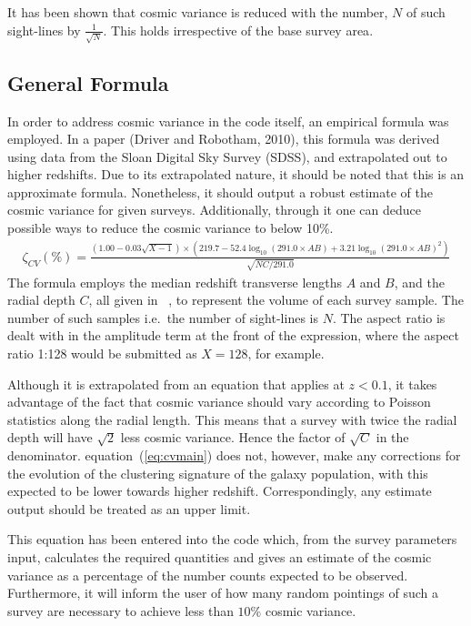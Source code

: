 			It has been shown that cosmic variance is reduced with the number, $N$ of such sight-lines by $\frac{1}{\sqrt{N}}$. This holds irrespective of the base survey area\cite{Driver01102010}.

	\subsection{General Formula} %
	\label{sub:general_formula}
		In order to address cosmic variance in the code itself, an empirical formula was employed. In a paper (Driver and Robotham, 2010), this formula was derived using data from the Sloan Digital Sky Survey (SDSS), and extrapolated out to higher redshifts\cite{Driver01102010}. Due to its extrapolated nature, it should be noted that this is an approximate formula. Nonetheless, it should output a robust estimate of the cosmic variance for given surveys. Additionally, through it one can deduce possible ways to reduce the cosmic variance to below 10\%.
		\begin{align}
			\zeta _{CV}(\%)=\frac{\left( 1.00-0.03\sqrt{X-1} \right)\times \left( 219.7-52.4\log_{10}\left(291.0\times AB \right) + 3.21\log_{10}{\left(291.0\times AB\right)}^{2} \right)}{\sqrt{NC/291.0}} \label{eq:cvmain}
		\end{align}
		The formula employs the median redshift transverse lengths $A$ and $B$, and the radial depth $C$, all given in \si{\mega\parsec}, to represent the volume of each survey sample. The number of such samples i.e.\ the number of sight-lines is $N$. The aspect ratio is dealt with in the amplitude term at the front of the expression, where the aspect ratio 1:128 would be submitted as $X=128$, for example.

		Although it is extrapolated from an equation that applies at $z<0.1$, it takes advantage of the fact that cosmic variance should vary according to Poisson statistics along the radial length. This means that a survey with twice the radial depth will have $\sqrt{2}$ less cosmic variance. Hence the factor of $\sqrt{C}$ in the denominator. equation~(\ref{eq:cvmain}) does not, however, make any corrections for the evolution of the clustering signature of the galaxy population, with this expected to be lower towards higher redshift. Correspondingly, any estimate output should be treated as an upper limit.

		This equation has been entered into the code which, from the survey parameters input, calculates the required quantities and gives an estimate of the cosmic variance as a percentage of the number counts expected to be observed. Furthermore, it will inform the user of how many random pointings of such a survey are necessary to achieve less than $10\%$ cosmic variance.


